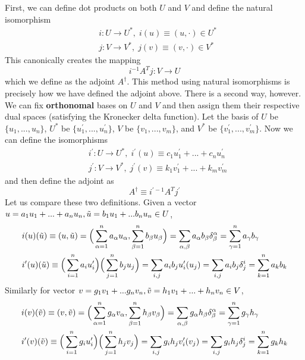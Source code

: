   First, we can define dot products on both $U$ and $V$ and define the natural isomorphism 
  \begin{align*}
      &i: U \longrightarrow U^*, \; i(u) \equiv (u, \cdot) \in U^*\\
      &j: V \longrightarrow V^*, \; j(v) \equiv (v, \cdot) \in V^*
  \end{align*}
  This canonically creates the mapping 
  \[i^{-1} A^T j: V \longrightarrow U\]
  which we define as the adjoint $A^\dagger$. This method using natural isomorphisms is precisely how we have defined the adjoint above. There is a second way, however. We can fix \textbf{orthonomal} bases on $U$ and $V$ and then assign them their respective dual spaces (satisfying the Kronecker delta function). Let the basis of $U$ be $\{u_1, ..., u_n\}$, $U^*$ be $\{u_1^\prime, ..., u_n^\prime\}$, $V$ be $\{v_1, ..., v_m\}$, and $V^*$ be $\{v_1^\prime, ..., v_m^\prime\}$. Now we can define the isomorphisms 
  \begin{align*}
      & i^\prime: U \longrightarrow U^*, \; i^\prime (u) \equiv c_1 u_1^\prime + ... + c_n u_n^\prime \\
      & j^\prime: V \longrightarrow V^*, \; j^\prime (v) \equiv k_1 v_1^\prime + ... + k_m v_m^\prime
  \end{align*}
  and then define the adjoint as 
  \[A^\dagger \equiv i^{\prime -1} A^T j^\prime\]
  Let us compare these two definitions. Given a vector $u = a_1 u_1 + ... + a_n u_n, \Tilde{u} = b_1 u_1 + ... b_n u_n \in U$, 
  \begin{align*}
      &i(u)(\Tilde{u}) \equiv (u, \Tilde{u}) = \Big(\sum_{\alpha = 1}^n a_\alpha u_\alpha, \sum_{\beta = 1}^n b_\beta u_\beta \Big) = \sum_{\alpha, \beta} a_\alpha b_\beta \delta^\alpha_\beta = \sum_{\gamma=1}^n a_\gamma b_\gamma \\
      &i^\prime(u)(\Tilde{u}) \equiv \Big(\sum_{i=1}^n a_i u_i^\prime \Big) \Big( \sum_{j=1}^n b_j u_j \Big) = \sum_{i, j} a_i b_j u_i^\prime (u_j) = \sum_{i, j} a_i b_j \delta^i_j = \sum_{k=1}^n a_k b_k
  \end{align*}
  Similarly for vector $v = g_1 v_1 + ... g_n v_n, \Tilde{v} = h_1 v_1 + ... + h_n v_n \in V$, 
  \begin{align*}
      &i(v)(\Tilde{v}) \equiv (v, \Tilde{v}) = \Big(\sum_{\alpha = 1}^n g_\alpha v_\alpha, \sum_{\beta = 1}^n h_\beta v_\beta \Big) = \sum_{\alpha, \beta} g_\alpha h_\beta \delta^\alpha_\beta = \sum_{\gamma=1}^n g_\gamma h_\gamma \\
      &i^\prime(v)(\Tilde{v}) \equiv \Big(\sum_{i=1}^n g_i u_i^\prime \Big) \Big( \sum_{j=1}^n h_j v_j \Big) = \sum_{i, j} g_i h_j v_i^\prime (v_j) = \sum_{i, j} g_i h_j \delta^i_j = \sum_{k=1}^n g_k h_k
  \end{align*}
